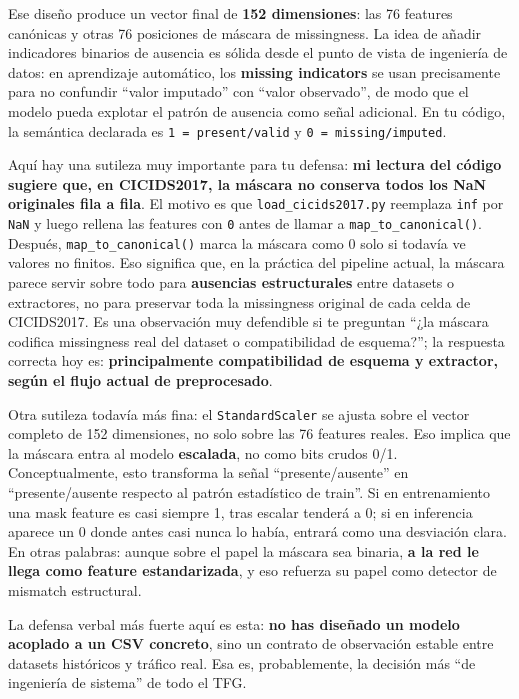 ﻿\documentclass[12pt,a4paper]{article}
\begin{document}
Ese diseño produce un vector final de \textbf{152 dimensiones}: las 76 features canónicas y otras 76
posiciones de máscara de missingness. La idea de añadir indicadores binarios de ausencia es sólida
desde el punto de vista de ingeniería de datos: en aprendizaje automático, los \textbf{missing
indicators} se usan precisamente para no confundir ``valor imputado'' con ``valor observado'', de
modo que el modelo pueda explotar el patrón de ausencia como señal adicional. En tu código, la
semántica declarada es \texttt{1 = present/valid} y \texttt{0 = missing/imputed}.

Aquí hay una sutileza muy importante para tu defensa: \textbf{mi lectura del código sugiere que, en
CICIDS2017, la máscara no conserva todos los NaN originales fila a fila}. El motivo es que
\verb|load_cicids2017.py| reemplaza \texttt{inf} por \texttt{NaN} y luego rellena las features con
\texttt{0} antes de llamar a \verb|map_to_canonical()|. Después, \verb|map_to_canonical()| marca la
máscara como 0 solo si todavía ve valores no finitos. Eso significa que, en la práctica del pipeline
actual, la máscara parece servir sobre todo para \textbf{ausencias estructurales} entre datasets o
extractores, no para preservar toda la missingness original de cada celda de CICIDS2017. Es una
observación muy defendible si te preguntan ``¿la máscara codifica missingness real del dataset o
compatibilidad de esquema?''; la respuesta correcta hoy es: \textbf{principalmente compatibilidad
de esquema y extractor, según el flujo actual de preprocesado}.

Otra sutileza todavía más fina: el \texttt{StandardScaler} se ajusta sobre el vector completo de 152
dimensiones, no solo sobre las 76 features reales. Eso implica que la máscara entra al modelo
\textbf{escalada}, no como bits crudos 0/1. Conceptualmente, esto transforma la señal
``presente/ausente'' en ``presente/ausente respecto al patrón estadístico de train''. Si en
entrenamiento una mask feature es casi siempre 1, tras escalar tenderá a 0; si en inferencia aparece
un 0 donde antes casi nunca lo había, entrará como una desviación clara. En otras palabras: aunque
sobre el papel la máscara sea binaria, \textbf{a la red le llega como feature estandarizada}, y eso
refuerza su papel como detector de mismatch estructural.

La defensa verbal más fuerte aquí es esta: \textbf{no has diseñado un modelo acoplado a un CSV
concreto}, sino un contrato de observación estable entre datasets históricos y tráfico real. Esa es,
probablemente, la decisión más ``de ingeniería de sistema'' de todo el TFG.
\end{document}
